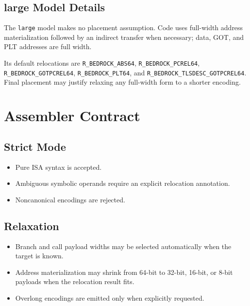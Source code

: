 \documentclass[10pt,twoside]{article}
\begin{document}
\subsection{large Model Details}
The \texttt{large} model makes no placement assumption. Code uses full-width
address materialization followed by an indirect transfer when necessary; data,
GOT, and PLT addresses are full width.

Its default relocations are \texttt{R\_BEDROCK\_ABS64},
\texttt{R\_BEDROCK\_PCREL64}, \texttt{R\_BEDROCK\_GOTPCREL64},
\texttt{R\_BEDROCK\_PLT64}, and
\texttt{R\_BEDROCK\_TLSDESC\_GOTPCREL64}. Final placement may justify
relaxing any full-width form to a shorter encoding.

\clearpage
\section{Assembler Contract}\label{page:assembler-contract}
\subsection{Strict Mode}
\begin{itemize}
\item Pure ISA syntax is accepted.
\item Ambiguous symbolic operands require an explicit relocation annotation.
\item Noncanonical encodings are rejected.
\end{itemize}
\subsection{Relaxation}
\begin{itemize}
\item Branch and call payload widths may be selected automatically when the target is known.
\item Address materialization may shrink from 64-bit to 32-bit, 16-bit, or 8-bit payloads when the relocation result fits.
\item Overlong encodings are emitted only when explicitly requested.
\end{itemize}
\end{document}

